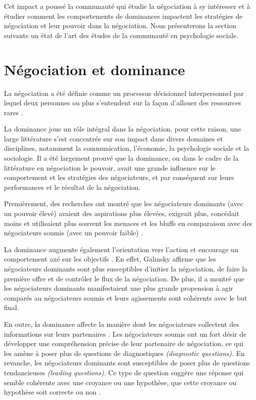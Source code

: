 			Cet impact a poussé la communauté qui étudie la négociation à sy intéresser et à étudier comment les comportements de dominances impactent les stratégies de négociation et leur pouvoir dans la négociation. 
			Nous présenterons la section suivante un état de l'art des études de la communauté en psychologie sociale.
			
			
	\section{Négociation et dominance}
	La négociation a été définie comme un processus décisionnel interpersonnel par lequel deux personnes ou plus s'entendent sur la façon d'allouer des ressources rares \cite{thompson2000mind}. 
	
	La dominance joue un rôle intégral dans la négociation, pour cette raison, une large littérature s'est concentrée sur son impact dans divers domaines et disciplines, notamment la communication, l'économie, la psychologie sociale et la sociologie.
	 Il a été largement prouvé que la dominance, ou dans le cadre de la littérature en négociation le pouvoir, avait une grande influence sur le comportement et les stratégies des négociateurs, et par conséquent sur leurs performances et le résultat de la négociation.
	
	Premièrement, des recherches ont montré que les négociateurs dominants (avec un pouvoir élevé) avaient des aspirations plus élevées, exigeait plus, concédait moins et utilisaient plus souvent les menaces et les bluffs en comparaison avec des négociateurs soumis (avec un pouvoir faible) \cite{de1995impact}.
	
	
	 La dominance augmente également l'orientation vers l'action et encourage un comportement axé sur les objectifs \cite{van2006power}. En effet, Galinsky \cite{galinsky2003power} affirme que les négociateurs dominants sont plus susceptibles d'initier la négociation, de faire la première offre et de contrôler le flux de la négociation.  De plus, il a montré que les négociateurs dominants manifestaient une plus grande propension à agir comparés au négociateurs soumis et leurs agissements sont cohérents avec le but final.
	 
	 
	 En outre, la dominance affecte la manière dont les négociateurs collectent des informations sur leurs partenaires \cite{de2004influence}. Les négociateurs soumis ont un fort désir de développer une compréhension précise de leur partenaire de négociation, ce qui les amène à poser plus de questions  de diagnostiques \emph {(diagnostic questions)}.
	 En revanche, les négociateurs dominants sont susceptibles de poser plus de questions tendancieuses \emph {(leading questions)}. Ce type de question suggère une réponse  qui semble cohérente avec une croyance ou une hypothèse, que cette croyance ou hypothèse soit correcte ou non \cite{galinsky2003power}.
	
